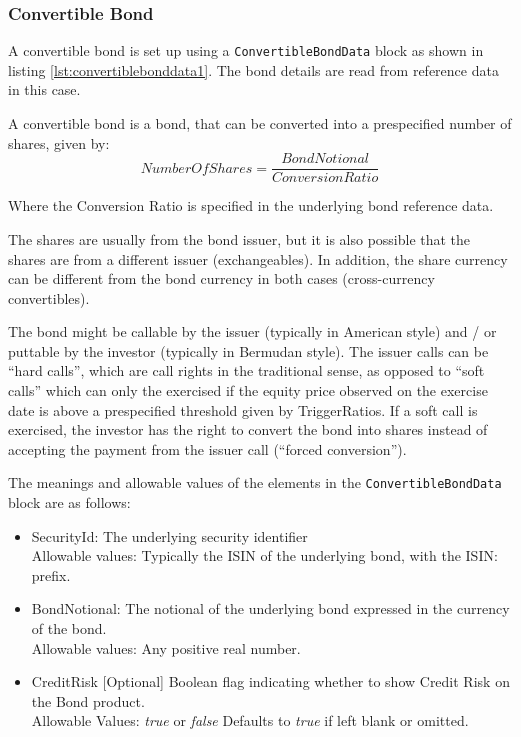 \subsubsection{Convertible Bond}
\label{ss:convertible_bond}

A convertible bond is set up using a {\tt ConvertibleBondData} block as shown in listing
\ref{lst:convertiblebonddata1}. The bond details are read from reference data in this case. 

A convertible bond is a bond, that can be converted into a prespecified number of shares, given by:
$$
NumberOfShares = \frac{BondNotional}{ConversionRatio}
$$

Where the Conversion Ratio is specified in the underlying bond reference data.

The shares are usually from the bond issuer, but it is also possible that the shares are
from a different issuer (exchangeables). In addition, the share currency can be different
from the bond currency in both cases (cross-currency convertibles).


The bond might be callable by the issuer (typically in American style) and / or puttable
by the investor (typically in Bermudan style). The issuer calls can be “hard calls”,
which are call rights in the traditional sense, as opposed to “soft calls” which can only
the exercised if the equity price observed on the exercise date is above a prespecified
threshold given by TriggerRatios. If a soft call is exercised, the investor has the right to convert the bond into
shares instead of accepting the payment from the issuer call (“forced conversion”).


The meanings and allowable
values of the elements in the {\tt ConvertibleBondData} block are as follows:

\begin{itemize}
  \item SecurityId: The underlying security identifier\\
      Allowable values:  Typically the ISIN of the underlying bond, with the ISIN: prefix.
  \item BondNotional: The notional of the underlying bond expressed in the currency of the bond.\\
      Allowable values:  Any positive real number.
    \item CreditRisk [Optional] Boolean flag indicating whether to show Credit Risk on the Bond product. \\
      Allowable Values: \emph{true} or \emph{false} Defaults to \emph{true} if left blank or omitted.          
\end{itemize}

